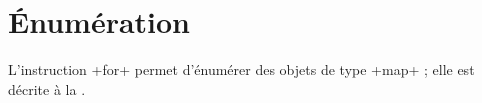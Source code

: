 %
%
%
%
%
%
%
%
%
%
%




\section{Énumération}

L'instruction \ggst+for+ permet d'énumérer des objets de type \ggst+map+ ; elle est décrite à la .

